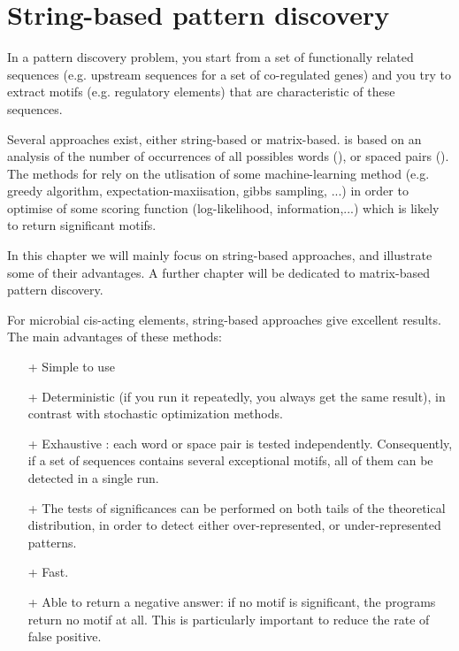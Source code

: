 \chapter{String-based pattern discovery}

In a pattern discovery problem, you start from a set of functionally
related sequences (e.g.  upstream sequences for a set of co-regulated
genes) and you try to extract motifs (e.g. regulatory elements) that
are characteristic of these sequences.

Several approaches exist, either string-based or
matrix-based.  is based on an
analysis of the number of occurrences of all possibles words
(), or spaced pairs
(). The methods for  rely on the utlisation of some machine-learning
method (e.g. greedy algorithm, expectation-maxiisation, gibbs
sampling, ...) in order to optimise of some scoring function
(log-likelihood, information,...) which is likely to return
significant motifs.

In this chapter we will mainly focus on string-based approaches, and
illustrate some of their advantages. A further chapter will be
dedicated to matrix-based pattern discovery.

For microbial cis-acting elements, string-based approaches give
excellent results. The main advantages of these methods:

\begin{itemize}
\item[+] Simple to use
\item[+] Deterministic (if you run it repeatedly, you always get the
  same result), in contrast with stochastic optimization methods.
\item[+] Exhaustive : each word or space pair is tested
  independently. Consequently, if a set of sequences contains several
  exceptional motifs, all of them can be detected in a single run. 
\item[+] The tests of significances can be performed on both tails of
  the theoretical distribution, in order to detect either
  over-represented, or under-represented patterns.
\item[+] Fast. 
\item[+] Able to return a negative answer: if no motif is significant,
  the programs return no motif at all. This is particularly important
  to reduce the rate of false positive.
\end{itemize}


